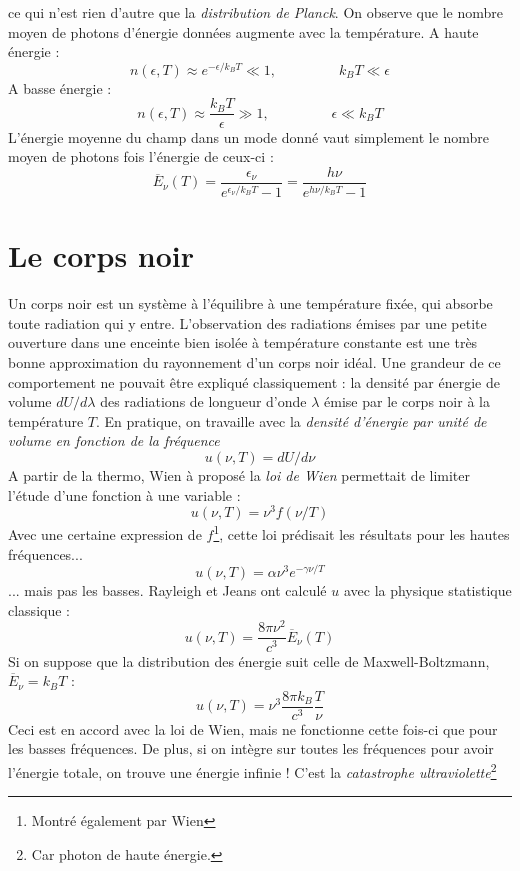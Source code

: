 \documentclass	[11pt, a4paper, openany]{book}
\begin{document}
ce qui n'est rien d'autre que la \textit{distribution de Planck}. On observe que le nombre moyen de 
photons d'énergie données augmente avec la température. A  haute énergie :
\begin{equation}
n(\epsilon,T) \approx e^{-\epsilon/k_BT} \ll 1,\ \ \ \ \ \ \ \ \ \ \ \ \ \ \ \ \ \ \ \  k_BT\ll\epsilon
\end{equation}
A basse énergie :
\begin{equation}
n(\epsilon,T) \approx \frac{k_BT}{\epsilon} \gg 1,\ \ \ \ \ \ \ \ \ \ \ \ \ \ \ \ \ \ \ \ \epsilon\ll k_BT
\end{equation}
L'énergie moyenne du champ dans un mode donné vaut simplement le nombre moyen de photons fois l'énergie 
de ceux-ci :
\begin{equation}
\overline{E}_\nu(T) = \dfrac{\epsilon_\nu}{e^{\epsilon_\nu/k_BT}-1} = \dfrac{h\nu}{e^{h\nu/k_BT}-1}
\end{equation}


\section{Le corps noir}
Un corps noir est un système à l'équilibre à une température fixée, qui absorbe toute radiation qui y 
entre. L'observation des radiations émises par une petite ouverture dans une enceinte bien isolée à 
température constante est une très bonne approximation du rayonnement d'un corps noir idéal. Une 
grandeur de ce comportement ne pouvait être expliqué classiquement : la densité par énergie de volume 
$dU/d\lambda$ des radiations de longueur d'onde $\lambda$ émise par le corps noir à la température $T$.
En pratique, on travaille avec la \textit{densité d'énergie par unité de volume en fonction de la fréquence} 
\begin{equation}
u(\nu,T) = dU/d\nu
\end{equation}
A partir de la thermo, Wien à proposé la \textit{loi de Wien} permettait de limiter l'étude d'une fonction
à une variable :
\begin{equation}
u(\nu,T) = \nu^3f(\nu/T)
\end{equation}
Avec une certaine expression de $f$\footnote{Montré également par Wien}, cette loi prédisait les résultats 
pour les hautes fréquences...
\begin{equation}
u(\nu,T) = \alpha \nu^3 e^{-\gamma\nu/T}
\end{equation}
... mais pas les basses. Rayleigh et Jeans ont calculé $u$ avec la physique statistique classique :
\begin{equation}
u(\nu,T) = \dfrac{8\pi\nu^2}{c^3}\overline{E}_\nu(T)
\end{equation}
Si on suppose que la distribution des énergie suit celle de Maxwell-Boltzmann, $\overline{E}_\nu=k_BT$ :
\begin{equation}
u(\nu,T) = \nu^3\dfrac{8\pi k_B}{c^3}\dfrac{T}{\nu}
\end{equation}
Ceci est en accord avec la loi de Wien, mais ne fonctionne cette fois-ci que pour les basses fréquences. De 
plus, si on intègre sur toutes les fréquences pour avoir l'énergie totale, on trouve une énergie infinie ! 
C'est la \textit{catastrophe ultraviolette}\footnote{Car photon de haute énergie.}
\end{document}
